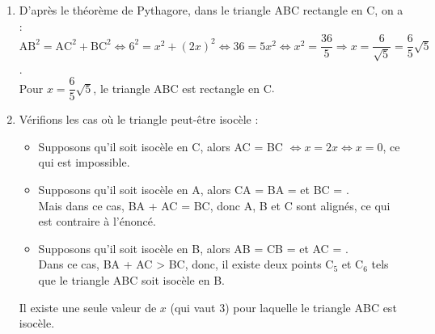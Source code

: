 \begin{enumerate}
         \begin{enumerate}
            \item Si $x=9$, alors AC =  et BC = . Or, AB = , et $6+9 =15$ donc, BA + AC < BC, ce qui signifie qu'on ne peut pas construire un triangle. {\blue Il n'existe pas de point C pour $x=9$}.
            \item Si $x=5$, alors AC =  et BC = . Or, AB = , et $6+5 =11$ donc, BA + AC > BC, ce qui signifie que l'on peut construire un triangle. Dans ce cas, C est sur le cercle de centre A de rayon  et sur le cercle de centre B de rayon . Ces deux cercles sont sécants en deux points C$_3$ et C$_4$. \\
            {\blue Il existe deux points C pour $x=5$}.
         \end{enumerate}
      \setcounter{enumi}{2}
      \item D'après le théorème de Pythagore, dans le triangle ABC rectangle en C, on a : \\
         $\text{AB}^2 =\text{AC}^2+\text{BC}^2 \iff 6^2 =x^2+(2x)^2 \iff 36 =5x^2 \iff x^2 =\dfrac{36}{5} \Longrightarrow x=\dfrac{6}{\sqrt5} =\dfrac{6}{5}\sqrt5$. \\
         {\blue Pour $x=\dfrac65\sqrt5$, le triangle ABC est rectangle en C}.
       \item Vérifions les cas où le triangle peut-être isocèle :
          \begin{itemize}
            \item Supposons qu'il soit isocèle en C, alors AC = BC $\iff x =2x \iff x=0$, ce qui est impossible.
            \item Supposons qu'il soit isocèle en A, alors CA = BA =  et BC = . \\
               Mais dans ce cas, BA + AC = BC, donc A, B et C sont alignés, ce qui est contraire à l'énoncé.
             \item Supposons qu'il soit isocèle en B, alors AB = CB =  et AC = . \\
               Dans ce cas, BA + AC > BC, donc, il existe deux points C$_5$ et C$_6$ tels que le triangle ABC soit isocèle en B.
          \end{itemize}
         {\blue Il existe une seule valeur de $x$ (qui vaut 3) pour laquelle le triangle ABC est isocèle}.
   \end{enumerate}
